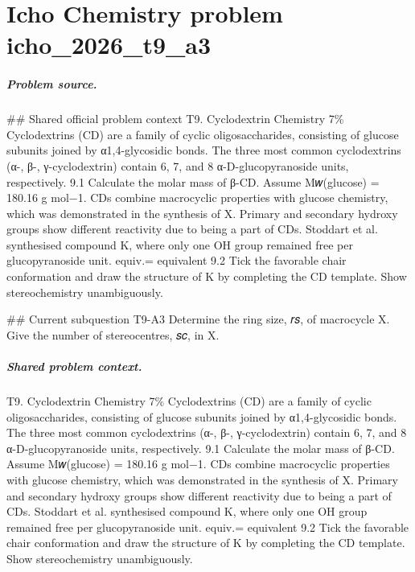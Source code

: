 
\chapter{Icho Chemistry problem icho\_2026\_t9\_a3}
\label{ch:IChO2026Problems_problem_icho_2026_t9_a3}

\paragraph{Problem source.}
\#\# Shared official problem context
T9. Cyclodextrin Chemistry 7\% Cyclodextrins (CD) are a family of cyclic oligosaccharides, consisting of glucose subunits joined by α1,4-glycosidic bonds. The three most common cyclodextrins (α-, β-, γ-cyclodextrin) contain 6, 7, and 8 α-D-glucopyranoside units, respectively. 9.1 Calculate the molar mass of β-CD. Assume M𝑤(glucose) = 180.16 g mol−1. CDs combine macrocyclic properties with glucose chemistry, which was demonstrated in the synthesis of X. Primary and secondary hydroxy groups show different reactivity due to being a part of CDs. Stoddart et al. synthesised compound K, where only one OH group remained free per glucopyranoside unit. equiv.= equivalent 9.2 Tick the favorable chair conformation and draw the structure of K by completing the CD template. Show stereochemistry unambiguously.

\#\# Current subquestion T9-A3
Determine the ring size, 𝑟𝑠, of macrocycle X. Give the number of stereocentres, 𝑠𝑐, in X.

\paragraph{Shared problem context.}
T9. Cyclodextrin Chemistry 7\% Cyclodextrins (CD) are a family of cyclic oligosaccharides, consisting of glucose subunits joined by α1,4-glycosidic bonds. The three most common cyclodextrins (α-, β-, γ-cyclodextrin) contain 6, 7, and 8 α-D-glucopyranoside units, respectively. 9.1 Calculate the molar mass of β-CD. Assume M𝑤(glucose) = 180.16 g mol−1. CDs combine macrocyclic properties with glucose chemistry, which was demonstrated in the synthesis of X. Primary and secondary hydroxy groups show different reactivity due to being a part of CDs. Stoddart et al. synthesised compound K, where only one OH group remained free per glucopyranoside unit. equiv.= equivalent 9.2 Tick the favorable chair conformation and draw the structure of K by completing the CD template. Show stereochemistry unambiguously.

